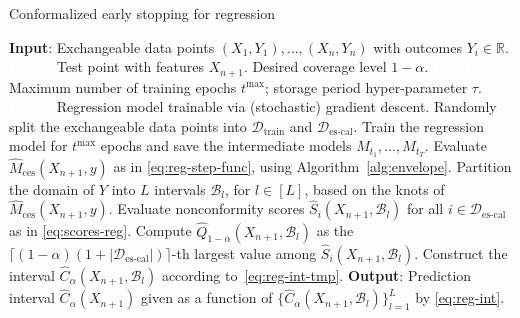 \begin{algorithm}[H]
    \caption{Conformalized early stopping for regression}
    \label{alg:reg}
    \begin{algorithmic}[1]
        \STATE \textbf{Input}: Exchangeable data points $(X_{1},Y_{1}), \ldots, (X_{n},Y_{n})$ with outcomes $Y_i \in \mathbb{R}$.
        \STATE \textcolor{white}{\textbf{Input}:} Test point with features $X_{n+1}$. Desired coverage level $1-\alpha$.
        \STATE \textcolor{white}{\textbf{Input}:} Maximum number of training epochs $t^{\text{max}}$; storage period hyper-parameter $\tau$.
        \STATE \textcolor{white}{\textbf{Input}:} Regression model trainable via (stochastic) gradient descent.
        \STATE Randomly split the exchangeable data points into $\mathcal{D}_{\text{train}}$ and $\mathcal{D}_{\text{es-cal}}$.
        \STATE Train the regression model for $t^{\text{max}}$ epochs and save the intermediate models $M_{t_1} , \dots, M_{t_T}$.
        \STATE Evaluate $\hat{M}_{\text{ces}}(X_{n+1},y)$ as in \eqref{eq:reg-step-func}, using Algorithm~\ref{alg:envelope}.
        \STATE Partition the domain of $Y$ into $L$ intervals $\mathcal{B}_l$, for $l \in [L]$, based on the knots of $\hat{M}_{\text{ces}}(X_{n+1},y)$.
        \STATE Evaluate nonconformity scores $\hat{S}_i(X_{n+1},\mathcal{B}_l)$ for all $i \in \mathcal{D}_{\text{es-cal}}$ as in \eqref{eq:scores-reg}.
        \STATE Compute $\hat{Q}_{1-\alpha}(X_{n+1},\mathcal{B}_l)$ as the $\lceil (1-\alpha)(1+|\mathcal{D}_{\text{es-cal}}|) \rceil$-th largest value among $\hat{S}_i(X_{n+1},\mathcal{B}_l)$.
 \STATE Construct the interval $\hat{C}_{\alpha}(X_{n+1}, \mathcal{B}_l)$ according to~\eqref{eq:reg-int-tmp}.
        \ENDFOR
        \STATE \textbf{Output}: Prediction interval $\hat{C}_{\alpha}(X_{n+1})$ given as a function of $\{\hat{C}_{\alpha}(X_{n+1}, \mathcal{B}_l)\}_{l=1}^{L}$ by \eqref{eq:reg-int}.
    \end{algorithmic}
\end{algorithm}




